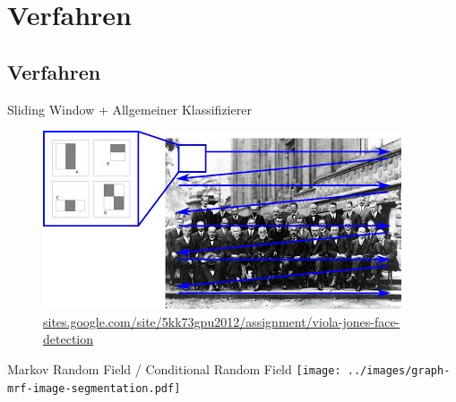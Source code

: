 \section{Verfahren}
\subsection{Verfahren}

\begin{frame}{Sliding Window + Allgemeiner Klassifizierer}
    \begin{figure}[ht]
        \centering
        \includegraphics[width=\textwidth]{../images/sliding_window.jpg}
        \caption{\tiny \href{https://sites.google.com/site/5kk73gpu2012/assignment/viola-jones-face-detection}{sites.google.com/site/5kk73gpu2012/assignment/viola-jones-face-detection}}
        \label{fig:sliding-window}
    \end{figure}
\end{frame}

\begin{frame}{Markov Random Field / Conditional Random Field}
    \texttt{[image: ../images/graph-mrf-image-segmentation.pdf]}
\end{frame}

